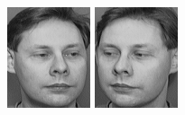 \begin{figure}[ht]
 \includegraphics[width=\columnwidth/11]{ch3/figures/s4_5.png}
 \includegraphics[width=\columnwidth/11]{ch3/figures/s4_6.png}

\end{figure}
